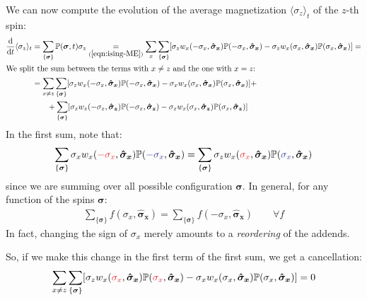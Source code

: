\documentclass[../../main.tex]{subfiles}
\begin{document}
\medskip

We can now compute the evolution of the average magnetization $\langle \sigma_z \rangle_t$ of the $z$-th spin:
\begin{align}\nonumber
    \dv{t} \langle \sigma_z \rangle_t &= \sum_{\{\bm{\sigma}\}} \mathbb{P}(\bm{\sigma},t) \sigma_z \underset{(\ref{eqn:ising-ME})}{=}  \sum_x \sum_{\{\bm{\sigma}\}} [\sigma_z w_x(-\sigma_x, \bm{\hat{\sigma}_x}) \mathbb{P}(-\sigma_x, \bm{\hat{\sigma}_x}) - \sigma_z w_x(\sigma_x, \bm{\hat{\sigma}_x}) \mathbb{P}(\sigma_x, \bm{\hat{\sigma}_x})] =\\
    \shortintertext{We split the sum between the terms with $x \neq z$ and the one with $x = z$:} \nonumber
    &= \sum_{x \neq z} \sum_{\{\bm{\sigma}\}} [\sigma_z w_x(-\sigma_x, \bm{\hat{\sigma}_x}) \mathbb{P}(-\sigma_x, \bm{\hat{\sigma}_x}) - \sigma_x w_x(\sigma_x, \bm{\hat{\sigma}_x}) \mathbb{P}(\sigma_x, \bm{\hat{\sigma}_x})] + \\ \label{eqn:avg-magnetization-ising}
    &\quad \>\>\>\> + \sum_{\{\bm{\sigma}\}} [\sigma_z w_z(-\sigma_z, \bm{\hat{\sigma}_z}) \mathbb{P}(-\sigma_z, \bm{\hat{\sigma}_z}) - \sigma_z w_z(\sigma_z, \bm{\hat{\sigma}_z}) \mathbb{P}(\sigma_z, \bm{\hat{\sigma}_z})]
\end{align}
In the first sum, note that:
\begin{align*}
    \sum_{\{\bm{\sigma}\}} \sigma_x w_x(\textcolor{Red}{-\sigma_x}, \bm{\hat{\sigma}_x}) \mathbb{P}(\textcolor{Blue}{-\sigma_x}, \bm{\hat{\sigma}_x}) = \sum_{\{\bm{\sigma}\}} \sigma_z w_x(\textcolor{Red}{\sigma_x}, \bm{\hat{\sigma}_x}) \mathbb{P}(\textcolor{Blue}{\sigma_x}, \bm{\hat{\sigma}_x})
\end{align*}
since we are summing over all possible configuration $\bm{\sigma}$. In general, for any function of the spins $\bm{\sigma}$:
\begin{align*}
    \sum_{\{\bm{\sigma}\}} f(\sigma_x, \bm{\hat{\sigma}_x}) = \sum_{\{\bm{\sigma}\}} f(-\sigma_x, \bm{\hat{\sigma}_x}) \qquad \forall f
\end{align*}
In fact, changing the sign of $\sigma_x$ merely amounts to a \textit{reordering} of the addends.

\medskip

So, if we make this change in the first term of the first sum, we get a cancellation:
\begin{align}\label{eqn:sum-a}
    \sum_{x \neq z} \sum_{\{\bm{\sigma}\}} [\sigma_z w_x(\textcolor{Red}{\sigma_x}, \bm{\hat{\sigma}_x}) \mathbb{P}(\textcolor{Red}{\sigma_x}, \bm{\hat{\sigma}_x}) - \sigma_x w_x(\sigma_x, \bm{\hat{\sigma}_x}) \mathbb{P}(\sigma_x, \bm{\hat{\sigma}_x})] = 0
\end{align}
\end{document}

